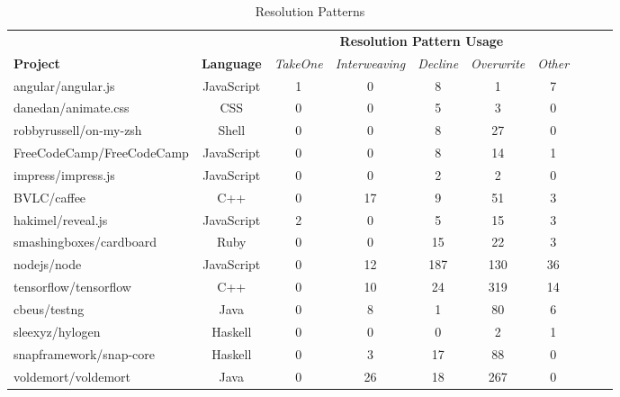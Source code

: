 \documentclass{sig-alternate-05-2015}
\begin{document}
\begin{table}[!htbp]
\centering
\caption{Resolution Patterns}
\begin{tabular}{| l | c | c | c | c | c | c | c | c | c | } \hline
\toprule
& & \multicolumn{5}{c}{\textbf{Resolution Pattern Usage}} \\
\textbf{Project} & \textbf{Language} & \textit{TakeOne} & \textit{Interweaving} & \textit{Decline} & \textit{Overwrite} & \textit{Other} \\ \hline
angular/angular.js & JavaScript & 1 & 0 & 8 & 1 & 7 \\ \hline
danedan/animate.css & CSS & 0 & 0 & 5 & 3 & 0 \\ \hline
robbyrussell/on-my-zsh & Shell & 0 & 0 & 8 & 27 & 0 \\ \hline
FreeCodeCamp/FreeCodeCamp & JavaScript & 0 & 0 & 8 & 14 & 1 \\ \hline
impress/impress.js & JavaScript & 0 & 0 & 2 & 2 & 0 \\ \hline
BVLC/caffee & C++ & 0 & 17 & 9 & 51 & 3 \\ \hline
hakimel/reveal.js & JavaScript & 2 & 0 & 5 & 15 & 3 \\ \hline
smashingboxes/cardboard & Ruby & 0 & 0 & 15 & 22 & 3 \\ \hline
nodejs/node & JavaScript & 0 & 12 & 187 & 130 & 36 \\ \hline
tensorflow/tensorflow & C++ & 0 & 10 & 24 & 319 & 14 \\ \hline
cbeus/testng & Java & 0 & 8 & 1 & 80 & 6 \\ \hline 
sleexyz/hylogen & Haskell & 0 & 0 & 0 & 2 & 1 \\ \hline
snapframework/snap-core & Haskell & 0 & 3 & 17 & 88 & 0 \\ \hline
voldemort/voldemort & Java & 0 & 26 & 18 & 267 & 0 \\ \hline
\end{tabular}
\label{table:t3}
\end{table}
\end{document}
